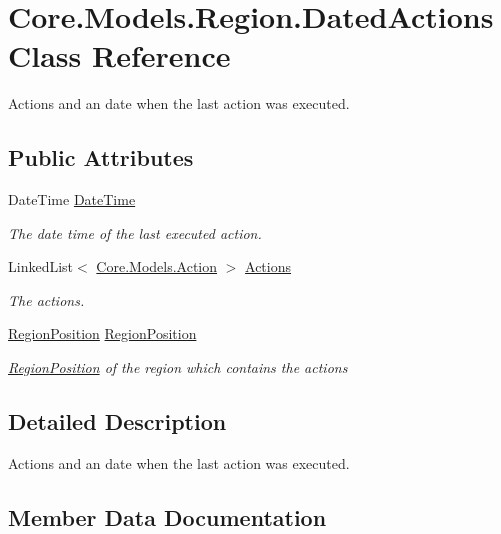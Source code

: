 \hypertarget{classCore_1_1Models_1_1Region_1_1DatedActions}{}\section{Core.\+Models.\+Region.\+Dated\+Actions Class Reference}
\label{classCore_1_1Models_1_1Region_1_1DatedActions}


Actions and an date when the last action was executed.  


\subsection*{Public Attributes}
\begin{DoxyCompactItemize}
\item 
Date\+Time \hyperlink{classCore_1_1Models_1_1Region_1_1DatedActions_aacd25bcefeefe28cab23509157ceafbf}{Date\+Time}
\begin{DoxyCompactList}\small\item\em The date time of the last executed action. \end{DoxyCompactList}\item 
Linked\+List$<$ \hyperlink{classCore_1_1Models_1_1Action}{Core.\+Models.\+Action} $>$ \hyperlink{classCore_1_1Models_1_1Region_1_1DatedActions_aeaa886f5b32791bbd8d3a98b9712c1e1}{Actions}
\begin{DoxyCompactList}\small\item\em The actions. \end{DoxyCompactList}\item 
\hyperlink{classCore_1_1Models_1_1RegionPosition}{Region\+Position} \hyperlink{classCore_1_1Models_1_1Region_1_1DatedActions_af5d142eb58d87b6d923f221b18b3bb20}{Region\+Position}
\begin{DoxyCompactList}\small\item\em \hyperlink{classCore_1_1Models_1_1RegionPosition}{Region\+Position} of the region which contains the actions \end{DoxyCompactList}\end{DoxyCompactItemize}


\subsection{Detailed Description}
Actions and an date when the last action was executed. 



\subsection{Member Data Documentation}
\hypertarget{classCore_1_1Models_1_1Region_1_1DatedActions_aeaa886f5b32791bbd8d3a98b9712c1e1}{}
